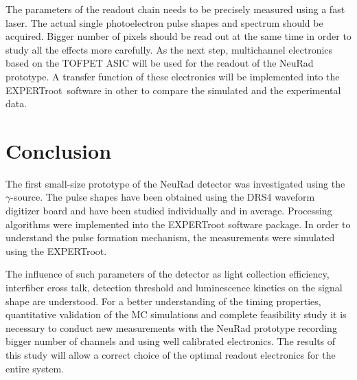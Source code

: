 \documentclass{webofc}
\newcommand{\er}{\textmd{EXPERTroot}}
\begin{document}
The parameters of the readout chain needs to be precisely measured using a fast laser. The actual single photoelectron pulse shapes and spectrum should be acquired. Bigger number of pixels should be read out at the same time in order to study all the effects more carefully. As the next step, multichannel electronics based on the TOFPET ASIC \cite{petsys} will be used for the readout of the NeuRad prototype. A transfer function of these electronics will be implemented into the \er\, software in other to compare the simulated and the experimental data.


\section{Conclusion}
		
	The first small-size prototype of the NeuRad detector was investigated using the $\gamma$-source. The pulse shapes have been obtained using the DRS4 waveform digitizer board and have been studied individually and in average. Processing algorithms were implemented into the EXPERTroot software package.
	In order to understand the pulse formation mechanism, the measurements were simulated using the \er.
	
	The influence of such parameters of the detector as light collection efficiency, interfiber cross talk, detection threshold and luminescence kinetics on the signal shape are understood. For a better understanding of the timing properties, quantitative validation of the MC simulations and complete feasibility study it is necessary to conduct new measurements with the NeuRad prototype recording bigger number of channels and using well calibrated electronics.
	The results of this study will allow a correct choice of the optimal readout electronics for the entire system.
	
	
	
	
	
\end{document}
